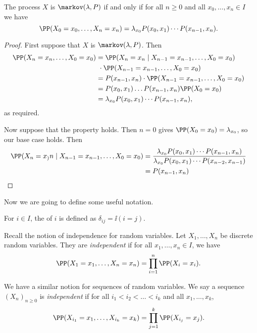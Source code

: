 \documentclass[a4paper]{scrartcl}
\begin{document}
\begin{theorem}
	The process $X$ is $\markov(\lambda, P)$ if and only if for all $n \geq 0$ and all $x_0, \dots, x_n \in I$ we have
	$$
	\PP(X_0 = x_0, \dots, X_n = x_n) = \lambda_{x_0} P(x_0, x_1) \cdots P(x_{n - 1}, x_n).
	$$
\end{theorem}
\begin{proof}
	First suppose that $X$ is $\markov(\lambda, P)$. Then
	\begin{align*}
		\PP(X_n = x_n, \dots, X_0 = x_0) &= \PP(X_n = x_n \mid X_{n - 1} = x_{n - 1} , \dots, X_0 = x_0) \\&\ \cdot \PP(X_{n - 1} = x_{n - 1} , \dots, X_0 = x_0)\\
		&= P(x_{n - 1}, x_n) \cdot \PP(X_{n - 1} = x_{n - 1} , \dots, X_0 = x_0) \\
		&= P(x_0, x_1) \dots P(x_{n - 1}, x_n) \PP(X_0 = x_0) \\
		&= \lambda_{x_0} P(x_0, x_1) \cdots P(x_{n - 1}, x_n),
	\end{align*}
	as required.

	Now suppose that the property holds. Then $n = 0$ gives $\PP(X_0 = x_0) = \lambda_{x_0}$, so our base case holds. Then
	\begin{align*}
		\PP(X_n = x_)n \mid X_{n - 1} = x_{n - 1} , \dots, X_0 = x_0) &= \frac{\lambda_{x_0}P(x_0, x_1)\cdots P(x_{n - 1}, x_n)}{\lambda_{x_0}P(x_0, x_1)\cdots P(x_{n - 2}, x_{n-1})}\\ 
		&= P(x_{n - 1}, x_n)
	\end{align*}
\end{proof}

Now we are going to define some useful notation.

\begin{definition}
	For $i \in I$, the  of $i$ is defined as
	$\delta_{ij} = \ii(i = j)$.
\end{definition}

Recall the notion of independence for random variables. Let $X_1, \dots, X_n$ be discrete random variables. They are \emph{independent} if for all $x_1, \dots, x_n \in I$, we have
$$
\PP(X_1= x_1, \dots, X_n = x_n) = \prod_{i = 1}^n \PP(X_i = x_i).
$$

We have a similar notion for sequences of random variables. We say a sequence $(X_n)_{n \geq 0}$ is \emph{independent} if for all $i_1 < i_2 < \dots < i_k$ and all $x_1, \dots, x_k$,
$$
\PP(X_{i_1} = x_1, \dots, X_{i_k} = x_k) = \prod_{j = 1}^k \PP(X_{i_j} = x_j).
$$
\end{document}
